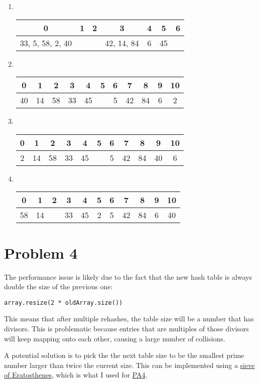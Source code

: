 \documentclass[12pt]{article}
\theoremstyle{definition}
\begin{document}
\begin{enumerate}[label=(\alph*)]
  \item
    ~\\
    \begin{tabular}{|c|c|c|c|c|c|c|}
      \hline
      0 & 1 & 2 & 3 & 4 & 5 & 6 \\ [0.5ex]
      \hline
      33, 5, 58, 2, 40 & & & 42, 14, 84 & 6 & 45 & \\
      \hline
    \end{tabular}
  \item
    ~\\
    \begin{tabular}{|c|c|c|c|c|c|c|c|c|c|c|}
      \hline
      0 & 1 & 2 & 3 & 4 & 5 & 6 & 7 & 8 & 9 & 10 \\ [0.5ex]
      \hline
      40 & 14 & 58 & 33 & 45 & & 5 & 42 & 84 & 6 & 2 \\
      \hline
    \end{tabular}
  \item
    ~\\
    \begin{tabular}{|c|c|c|c|c|c|c|c|c|c|c|}
      \hline
      0 & 1 & 2 & 3 & 4 & 5 & 6 & 7 & 8 & 9 & 10 \\ [0.5ex]
      \hline
      2 & 14 & 58 & 33 & 45 & & 5 & 42 & 84 & 40 & 6 \\
      \hline
    \end{tabular}
  \item
    ~\\
    \begin{tabular}{|c|c|c|c|c|c|c|c|c|c|c|}
      \hline
      0 & 1 & 2 & 3 & 4 & 5 & 6 & 7 & 8 & 9 & 10 \\ [0.5ex]
      \hline
      58 & 14 & & 33 & 45 & 2 & 5 & 42 & 84 & 6 & 40 \\
      \hline
    \end{tabular}
\end{enumerate}

\section{Problem 4}

The performance issue is likely due to the fact that the new hash
table is always double the size of the previous one:

\begin{verbatim}
array.resize(2 * oldArray.size())
\end{verbatim}

This means that after multiple rehashes, the table size will be a
number that has divisors. This is problematic because entries that
are multiples of those divisors will keep mapping onto each other,
causing a large number of collisions.

A potential solution is to pick the the next table size to be the
smallest prime number larger than twice the current size. This can be
implemented using a
\href{https://en.wikipedia.org/wiki/Sieve_of_Eratosthenes}{sieve of
Eratosthenes}, which is what I used for
\href{https://github.com/mathletedev/cpt_s/blob/b7051f9f4cdd25d00f1a66aae65da3f2133e4883/223/assignments/pa4/src/hash_map.hpp#L57}{PA4}.
\end{document}
